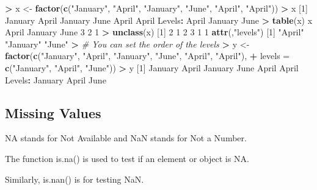 \documentclass[]{article}
\newenvironment{Shaded}{\begin{snugshade}}{\end{snugshade}}
\newcommand{\KeywordTok}[1]{\textcolor[rgb]{0.13,0.29,0.53}{\textbf{#1}}}
\newcommand{\DataTypeTok}[1]{\textcolor[rgb]{0.13,0.29,0.53}{#1}}
\newcommand{\DecValTok}[1]{\textcolor[rgb]{0.00,0.00,0.81}{#1}}
\newcommand{\StringTok}[1]{\textcolor[rgb]{0.31,0.60,0.02}{#1}}
\newcommand{\CommentTok}[1]{\textcolor[rgb]{0.56,0.35,0.01}{\textit{#1}}}
\newcommand{\OperatorTok}[1]{\textcolor[rgb]{0.81,0.36,0.00}{\textbf{#1}}}
\newcommand{\ErrorTok}[1]{\textcolor[rgb]{0.64,0.00,0.00}{\textbf{#1}}}
\newcommand{\NormalTok}[1]{#1}
\begin{document}
\begin{Shaded}
\begin{Highlighting}[]
\OperatorTok{>}\StringTok{ }\NormalTok{x <-}\StringTok{ }\KeywordTok{factor}\NormalTok{(}\KeywordTok{c}\NormalTok{(}\StringTok{"January"}\NormalTok{, }\StringTok{"April"}\NormalTok{, }\StringTok{"January"}\NormalTok{, }\StringTok{"June"}\NormalTok{, }\StringTok{"April"}\NormalTok{, }\StringTok{"April"}\NormalTok{))}
\OperatorTok{>}\StringTok{ }\NormalTok{x}
\NormalTok{[}\DecValTok{1}\NormalTok{] January April   January June    April   April  }
\NormalTok{Levels}\OperatorTok{:}\StringTok{ }\NormalTok{April January June}
\OperatorTok{>}\StringTok{ }\KeywordTok{table}\NormalTok{(x)}
\NormalTok{x}
\NormalTok{  April January    June }
      \DecValTok{3}       \DecValTok{2}       \DecValTok{1} 
\OperatorTok{>}\StringTok{ }\KeywordTok{unclass}\NormalTok{(x)}
\NormalTok{[}\DecValTok{1}\NormalTok{] }\DecValTok{2} \DecValTok{1} \DecValTok{2} \DecValTok{3} \DecValTok{1} \DecValTok{1}
\KeywordTok{attr}\NormalTok{(,}\StringTok{"levels"}\NormalTok{)}
\NormalTok{[}\DecValTok{1}\NormalTok{] }\StringTok{"April"}   \StringTok{"January"} \StringTok{"June"}   
\OperatorTok{>}\StringTok{ }\CommentTok{# You can set the order of the levels}
\ErrorTok{>}\StringTok{ }\NormalTok{y <-}\StringTok{ }\KeywordTok{factor}\NormalTok{(}\KeywordTok{c}\NormalTok{(}\StringTok{"January"}\NormalTok{, }\StringTok{"April"}\NormalTok{, }\StringTok{"January"}\NormalTok{, }\StringTok{"June"}\NormalTok{, }\StringTok{"April"}\NormalTok{, }\StringTok{"April"}\NormalTok{), }
\OperatorTok{+}\StringTok{             }\DataTypeTok{levels =} \KeywordTok{c}\NormalTok{(}\StringTok{"January"}\NormalTok{, }\StringTok{"April"}\NormalTok{, }\StringTok{"June"}\NormalTok{))}
\OperatorTok{>}\StringTok{ }\NormalTok{y}
\NormalTok{[}\DecValTok{1}\NormalTok{] January April   January June    April   April  }
\NormalTok{Levels}\OperatorTok{:}\StringTok{ }\NormalTok{January April June}
\end{Highlighting}
\end{Shaded}

\subsection{Missing Values}\label{missing-values}

NA stands for Not Available and NaN stands for Not a Number.

The function is.na() is used to test if an element or object is NA.

Similarly, is.nan() is for testing NaN.
\end{document}
